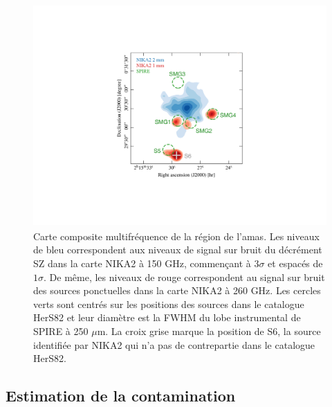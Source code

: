 \begin{figure}[t]
    \centering
    \includegraphics[height=8.5cm, trim={10cm 5cm 8cm 5cm}, clip]{Figures/Chap_actj0215/composite.pdf}
    \caption{%
        Carte composite multifréquence de la région de l'amas.
        Les niveaux de bleu correspondent aux niveaux de signal sur bruit du décrément SZ dans la carte NIKA2 à 150 GHz, commençant à $3\sigma$ et espacés de $1\sigma$.
        De même, les niveaux de rouge correspondent au signal sur bruit des sources ponctuelles dans la carte NIKA2 à 260 GHz.
        Les cercles verts sont centrés sur les positions des sources dans le catalogue HerS82 \cite{viero_herschel_2014} et leur diamètre est la FWHM du lobe instrumental de SPIRE à 250 $\mu$m.
        La croix grise marque la position de S6, la source identifiée par NIKA2 qui n'a pas de contrepartie dans le catalogue HerS82.
        }
    \label{fig:act:composite}
\end{figure}

\subsection{Estimation de la contamination}\label{subsec:act:sed}

